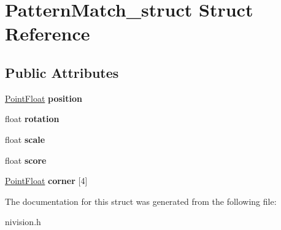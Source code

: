 \hypertarget{structPatternMatch__struct}{\section{\-Pattern\-Match\-\_\-struct \-Struct \-Reference}
\label{structPatternMatch__struct}
}
\subsection*{\-Public \-Attributes}
\begin{DoxyCompactItemize}
\item 
\hypertarget{structPatternMatch__struct_a9fbe7656bb01b36f00295ffe9d988145}{\hyperlink{structPointFloat__struct}{\-Point\-Float} {\bfseries position}}\label{structPatternMatch__struct_a9fbe7656bb01b36f00295ffe9d988145}

\item 
\hypertarget{structPatternMatch__struct_ad7d12f3601435e63ef151948dcc011fd}{float {\bfseries rotation}}\label{structPatternMatch__struct_ad7d12f3601435e63ef151948dcc011fd}

\item 
\hypertarget{structPatternMatch__struct_a54e8bf6c11d61f48b7b1e7a58c05cff8}{float {\bfseries scale}}\label{structPatternMatch__struct_a54e8bf6c11d61f48b7b1e7a58c05cff8}

\item 
\hypertarget{structPatternMatch__struct_a479e92bce65539f70d0aabfade021d0c}{float {\bfseries score}}\label{structPatternMatch__struct_a479e92bce65539f70d0aabfade021d0c}

\item 
\hypertarget{structPatternMatch__struct_a9068b5f0c377380130d7c83a1f5c3fbc}{\hyperlink{structPointFloat__struct}{\-Point\-Float} {\bfseries corner} \mbox{[}4\mbox{]}}\label{structPatternMatch__struct_a9068b5f0c377380130d7c83a1f5c3fbc}

\end{DoxyCompactItemize}


\-The documentation for this struct was generated from the following file\-:\begin{DoxyCompactItemize}
\item 
nivision.\-h\end{DoxyCompactItemize}
